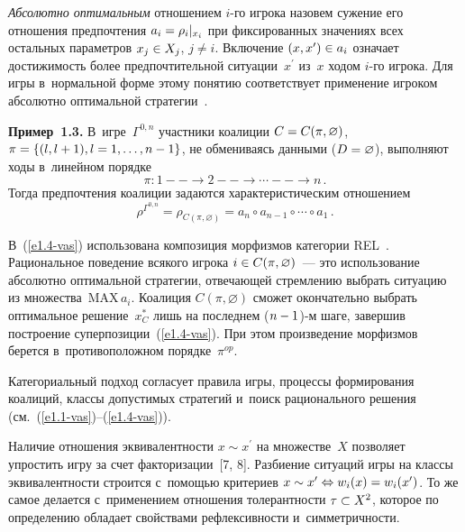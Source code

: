 \begin{multicols}{2}
    \textit{Абсолютно оптимальным} отношением $i$-го игрока назовем сужение 
его отношения предпочтения $a_i \hm= \rho_i\vert_{x_i}$ при фиксированных 
значениях всех остальных па\-ра\-мет\-ров $x_j\hm\in X_j$, $j\not= i$. Включение 
$(x,x^\prime)\hm\in a_i$ означает до\-сти\-жи\-мость более предпочтительной 
ситуации~$x^\prime$ из~$x$ ходом $i$-го игрока. Для игры в~нормальной форме 
этому понятию соответствует применение игроком абсолютно оптимальной 
стратегии~\cite{1-vas}.
    
    \textbf{Пример~1.3.} В~игре~$\Gamma^{0,n}$ участники коалиции $C\hm= 
C(\pi, \varnothing)$, $\pi \hm= \{ (l, l\hm+1), l=1,\ldots , n\hm-1\}$, не обмениваясь 
данными ($D\hm= \varnothing$), выполняют ходы в~линейном по\-рядке
\begin{equation}
\pi:\boxed{1}--\rightarrow \boxed{2}--\rightarrow\cdots--\rightarrow\boxed{n}\,.
\label{e1.3-vas}
\end{equation}
Тогда предпочтения коалиции задаются характеристическим от\-но\-ше\-нием
\begin{equation}
\rho^{\Gamma^{0,n}} =\rho_{C(\pi,\varnothing)} =a_n \circ a_{n-1} \circ \cdots \circ 
a_1\,.
\label{e1.4-vas}
\end{equation}
    
    В~(\ref{e1.4-vas}) использована композиция морфизмов категории 
REL~\cite{8-vas}. Рациональное поведение всякого игрока $i\hm\in C(\pi, 
\varnothing)$~--- это использование абсолютно оптимальной стратегии, от\-ве\-ча\-ющей 
стремлению вы\-брать ситуацию из множества~MAX\,$a_i$. Коалиция 
$C(\pi,\varnothing)$ сможет окончательно вы\-брать оптимальное решение~$x_C^*$ 
лишь на последнем ($n\hm-1$)-м шаге, завершив по\-стро\-ение 
суперпозиции~(\ref{e1.4-vas}). При этом произведение морфизмов берется 
в~противоположном порядке~$\pi^{op}$. 
    
    Категориальный подход согласует правила игры, процессы формирования 
коалиций, классы до\-пус\-ти\-мых стратегий и~поиск рационального решения  
(см.~(\ref{e1.1-vas})--(\ref{e1.4-vas})).
    
    Наличие отношения эк\-ви\-ва\-лент\-ности $x\sim x^\prime$ на множестве~$X$ 
поз\-во\-ля\-ет упрос\-тить игру за счет факторизации~[7, 8]. Раз\-би\-ение ситуаций игры на 
классы эк\-ви\-ва\-лент\-ности строится с~по\-мощью критериев $x\sim x^\prime 
\Leftrightarrow w_i(x)\hm= w_i(x^\prime)$. То же самое делается с~применением 
отношения то\-ле\-рант\-ности $\tau\hm\subset X^2$, которое по определению обладает 
свойствами реф\-лек\-сив\-ности и~сим\-мет\-рич\-ности.
    

\end{multicols}

